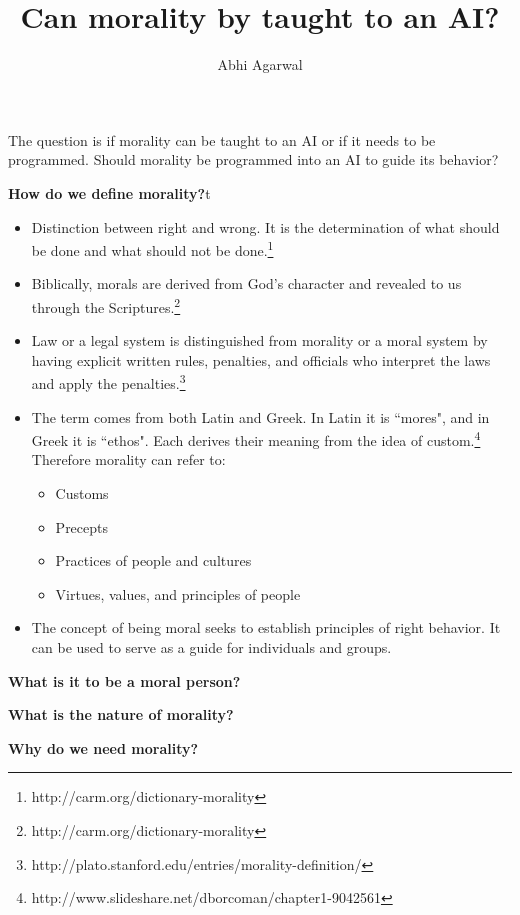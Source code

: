 \documentclass[11pt, oneside]{article}   	%
\title{Can morality by taught to an AI?}
\author{Abhi Agarwal}
\date{}							%
\begin{document}
\maketitle

\par The question is if morality can be taught to an AI or if it needs to be programmed. Should morality be programmed into an AI to guide its behavior? 

\par \textbf{How do we define morality?}t

\begin{itemize}
	\item Distinction between right and wrong. It is the determination of what should be done and what should not be done.\footnote{http://carm.org/dictionary-morality}
	\item Biblically, morals are derived from God's character and revealed to us through the Scriptures.\footnote{http://carm.org/dictionary-morality}
	\item Law or a legal system is distinguished from morality or a moral system by having explicit written rules, penalties, and officials who interpret the laws and apply the penalties.\footnote{http://plato.stanford.edu/entries/morality-definition/}
	\item The term comes from both Latin and Greek. In Latin it is ``mores", and in Greek it is ``ethos". Each derives their meaning from the idea of custom.\footnote{http://www.slideshare.net/dborcoman/chapter1-9042561} Therefore morality can refer to:
	\begin{itemize}
		\item Customs
		\item Precepts
		\item Practices of people and cultures
		\item Virtues, values, and principles of people
	\end{itemize}
	\item The concept of being moral seeks to establish principles of right behavior. It can be used to serve as a guide for individuals and groups. 
\end{itemize}

\par \textbf{What is it to be a moral person?}

\par \textbf{What is the nature of morality?}

\par \textbf{Why do we need morality?}
\end{document}
